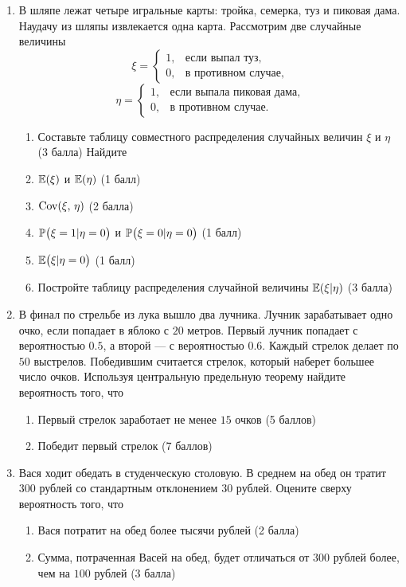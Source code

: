 \begin{enumerate}

    \item В шляпе лежат четыре игральные карты: тройка, семерка, туз и пиковая дама.
    Наудачу из шляпы извлекается одна карта. Рассмотрим две случайные величины
\[
    \xi = \left\{
                \begin{array}{ll}
                    1, & \text{если выпал туз,} \\
                    0, & \text{в противном случае,}
            \end{array}
            \right.
\]
\[
    \eta = \left\{
                \begin{array}{ll}
                    1, & \text{если выпала пиковая дама,} \\
                    0, & \text{в противном случае.}
            \end{array}
            \right.
\]
\begin{enumerate}
  \item Составьте таблицу совместного распределения случайных величин $\xi$ и $\eta$ (3 балла)
\newline Найдите
  \item $\E(\xi)$ и $\E(\eta)$ (1 балл)
  \item $\Cov(\xi, \, \eta)$ (2 балла)
  \item $\P\bigl(\xi = 1 | \eta = 0\bigr)$ и $\P\bigl(\xi = 0 | \eta = 0\bigr)$ (1 балл)
  \item $\E\bigl(\xi | \eta = 0 \bigr)$ (1 балл)
  \item Постройте таблицу распределения случайной величины $\E(\xi|\eta)$ (3 балла)
\end{enumerate}
    \item В финал по стрельбе из лука вышло два лучника. Лучник зарабатывает одно
    очко, если попадает в яблоко с $20$ метров. Первый лучник попадает
    с вероятностью $0.5$, а второй — с вероятностью $0.6$. Каждый стрелок делает
    по $50$ выстрелов. Победившим считается стрелок, который наберет большее число очков.
    Используя центральную предельную теорему найдите вероятность того, что
\begin{enumerate}
  \item Первый стрелок заработает не менее $15$ очков (5 баллов)
  \item Победит первый стрелок (7 баллов)
\end{enumerate}


    \item Вася ходит обедать в студенческую столовую. В среднем на обед он тратит
    $300$ рублей со стандартным отклонением $30$ рублей. Оцените сверху вероятность
    того, что
    \begin{enumerate}
    \item Вася потратит на обед более тысячи рублей (2 балла)
\item Сумма, потраченная Васей на обед, будет отличаться от $300$ рублей более,
чем на $100$ рублей (3 балла)
\end{enumerate}


\end{enumerate}
